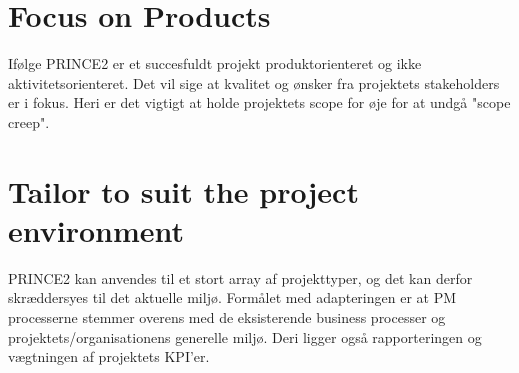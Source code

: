 \section{Focus on Products}
Ifølge PRINCE2 er et succesfuldt projekt produktorienteret og ikke aktivitetsorienteret. Det vil sige at kvalitet og ønsker fra projektets stakeholders er i fokus. Heri er det vigtigt at holde projektets scope for øje for at undgå "scope creep".

\section{Tailor to suit the project environment}
PRINCE2 kan anvendes til et stort array af projekttyper, og det kan derfor skræddersyes til det aktuelle miljø. Formålet med adapteringen er at PM processerne stemmer overens med de eksisterende business processer og projektets/organisationens generelle miljø. Deri ligger også rapporteringen og vægtningen af projektets KPI'er.
